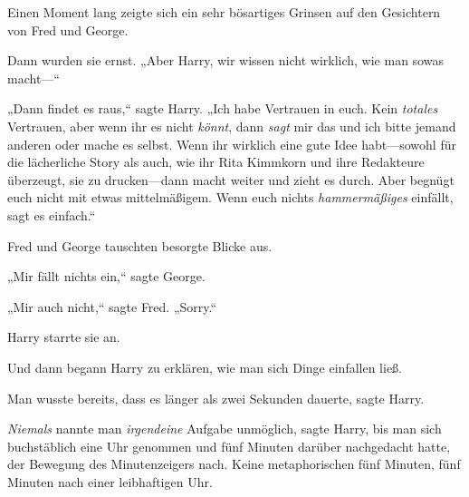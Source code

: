 Einen Moment lang zeigte sich ein sehr bösartiges Grinsen auf den Gesichtern von Fred und George.

Dann wurden sie ernst. „Aber Harry, wir wissen nicht wirklich, wie man sowas macht—“

„Dann findet es raus,“ sagte Harry. „Ich habe Vertrauen in euch. Kein \emph{totales} Vertrauen, aber wenn ihr es nicht \emph{könnt}, dann \emph{sagt} mir das und ich bitte jemand anderen oder mache es selbst. Wenn ihr wirklich eine gute Idee habt—sowohl für die lächerliche Story als auch, wie ihr Rita Kimmkorn und ihre Redakteure überzeugt, sie zu drucken—dann macht weiter und zieht es durch. Aber begnügt euch nicht mit etwas mittelmäßigem. Wenn euch nichts \emph{hammermäßiges} einfällt, sagt es einfach.“

Fred und George tauschten besorgte Blicke aus.

„Mir fällt nichts ein,“ sagte George.

„Mir auch nicht,“ sagte Fred. „Sorry.“

Harry starrte sie an.

Und dann begann Harry zu erklären, wie man sich Dinge einfallen ließ.

Man wusste bereits, dass es länger als zwei Sekunden dauerte, sagte Harry.

\emph{Niemals} nannte man \emph{irgendeine} Aufgabe unmöglich, sagte Harry, bis man sich buchstäblich eine Uhr genommen und fünf Minuten darüber nachgedacht hatte, der Bewegung des Minutenzeigers nach. Keine metaphorischen fünf Minuten, fünf Minuten nach einer leibhaftigen Uhr.

